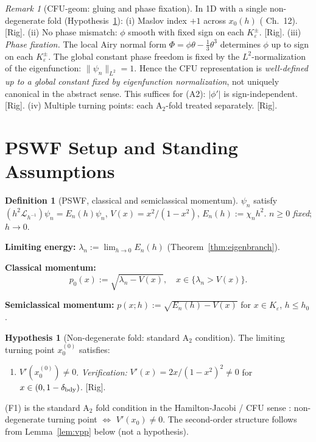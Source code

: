 \documentclass[12pt,a4paper]{amsart}
\theoremstyle{definition}
\newtheorem{definition}[theorem]{Definition}
\newtheorem{hypothesis}[theorem]{Hypothesis}
\theoremstyle{remark}
\newtheorem{remark}[theorem]{Remark}
\newcommand{\Rig}{\textup{[Rig]}}
\begin{document}
\begin{remark}[CFU-geom: gluing and phase fixation]
\label{rem:cfu-geom-nontrivial}
In 1D with a single non-degenerate fold (Hypothesis~\ref{hyp:a2-fold}):
(i) Maslov index $+1$ across $x_0(h)$ (\cite{Zworski2012} Ch.~12). \Rig.
(ii) No phase mismatch: $\phi$ smooth with fixed sign on each $K_\varepsilon^\pm$. \Rig.
(iii) \emph{Phase fixation.}
  The local Airy normal form $\Phi=\phi\theta-\tfrac13\theta^3$
  determines $\phi$ up to sign on each $K_\varepsilon^\pm$.
  The global constant phase freedom is fixed by the
  $L^2$-normalization of the eigenfunction: $\|\psi_n\|_{L^2}=1$.
  Hence the CFU representation is
  \emph{well-defined up to a global constant fixed by eigenfunction normalization},
  not uniquely canonical in the abstract sense.
  This suffices for (A2): $|\phi'|$ is sign-independent. \Rig.
(iv) Multiple turning points: each A$_2$-fold treated separately. \Rig.
\end{remark}

\section{PSWF Setup and Standing Assumptions}
\label{sec:pswf}

\begin{definition}[PSWF, classical and semiclassical momentum]
\label{def:pswf-p0}
$\psi_n$ satisfy $(h^2\mathcal{L}_{h^{-1}})\psi_n=E_n(h)\psi_n$,
$V(x)=x^2/(1-x^2)$, $E_n(h):=\chi_n h^2$.
$n\ge 0$ \emph{fixed}; $h\to 0$.

\noindent\textbf{Limiting energy:}
$\lambda_n:=\lim_{h\to 0}E_n(h)$ (Theorem~\ref{thm:eigenbranch}).

\noindent\textbf{Classical momentum:}
\begin{equation}\label{eq:p0-def}
  p_0(x):=\sqrt{\lambda_n-V(x)},\quad x\in\{\lambda_n>V(x)\}.
\end{equation}

\noindent\textbf{Semiclassical momentum:}
$p(x;h):=\sqrt{E_n(h)-V(x)}$ for $x\in K_\varepsilon$, $h\le h_0$.
\end{definition}

\begin{hypothesis}[Non-degenerate fold: standard A$_2$ condition]
\label{hyp:a2-fold}
The limiting turning point $x_0^{(0)}$ satisfies:
\begin{enumerate}[{\rm(F1)}]
\item $V'(x_0^{(0)})\ne 0$.
  \emph{Verification:} $V'(x)=2x/(1-x^2)^2\ne 0$
  for $x\in(0,1-\delta_{\rm bdy})$. \Rig.
\end{enumerate}
(F1) is the standard A$_2$ fold condition in the Hamilton-Jacobi / CFU sense
\cite{Zworski2012}: non-degenerate turning point $\Leftrightarrow$ $V'(x_0)\ne 0$.
The second-order structure follows from Lemma~\ref{lem:vpp} below (not a hypothesis).
\end{hypothesis}
\end{document}
